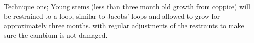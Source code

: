 Technique one; Young stems (less than three month old growth from coppice) will
be restrained to a loop, similar to Jacobs' loops \cite{jacobs1945l} and allowed to
grow for approximately three months, with regular adjustments of the restraints
to make sure the cambium is not damaged.